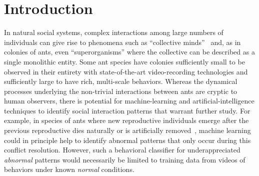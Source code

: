 \documentclass[letterpaper]{article} %
\begin{document}
\section{Introduction}
\label{sec:intro}

\noindent In natural social systems, complex interactions among large
numbers of individuals can give rise to phenomena such as ``collective
minds''~\citep{C07} and, as in colonies of ants, even ``superorganisms''
where the collective can be described as a single monolithic entity.
Some ant species have colonies sufficiently small to be observed 
in their entirety with state-of-the-art video-recording technologies 
and sufficiently large to have rich, multi-scale behaviors. Whereas 
the dynamical processes underlying the non-trivial interactions between ants
are cryptic to human observers, there is potential for
machine-learning and artificial-intelligence techniques to identify social
interaction patterns that warrant further study. For example, in species
of ants where new reproductive individuals emerge after
the previous reproductive dies naturally or is artificially 
removed~\citep{HHP94, SPSHPL16}, machine learning could in principle 
help to identify abnormal patterns that only occur during this conflict 
resolution. However, such a behavioral
classifier for underappreciated \emph{abnormal} patterns would
necessarily be limited to training data from videos of behaviors under
known \emph{normal} conditions.
\end{document}
